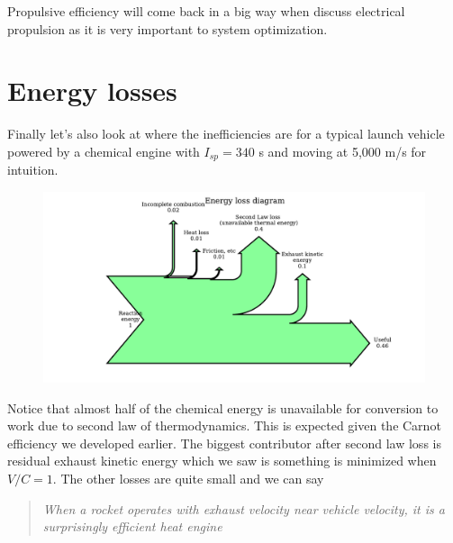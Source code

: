 \documentclass[twocolumn]{memoir} %
\begin{document}
Propulsive efficiency will come back in a big way when discuss electrical propulsion as it is very important to system optimization.

\section{Energy losses}\label{energy-losses}

Finally let's also look at where the inefficiencies are for a typical launch vehicle powered by a chemical engine with \(I_{sp} = 340\) s and moving at 5,000 m/s for intuition.

\begin{figure}[H]
    \includegraphics[width=\columnwidth]{sankey}
\end{figure}
%
Notice that almost half of the chemical energy is unavailable for conversion to work due to second law of thermodynamics.  This is expected given the Carnot efficiency we developed earlier.  The biggest contributor after second law loss is residual exhaust kinetic energy which we saw is something is minimized when $V/C = 1$.  The other losses are quite small and we can say

\begin{quote}
    \emph{When a rocket operates with exhaust velocity near vehicle velocity,
    it is a surprisingly efficient heat engine}
\end{quote}
\end{document}
